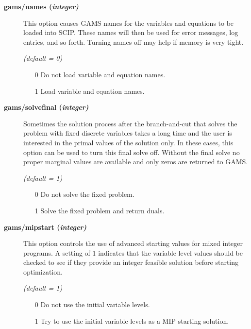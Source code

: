 \begin{description}
\item[\label{scipnames}\hypertarget{scipnames}
{\textbf{gams/names (\slshape{integer})}}]\hspace{1.0in}

This option causes GAMS names for the variables and equations to be loaded into SCIP.
These names will then be used for error messages, log entries, and so forth.
Turning names off may help if memory is very tight.

\textsl{(default = 0)}
\begin{itemize}
\item[0] Do not load variable and equation names.
\item[1] Load variable and equation names.
\end{itemize}


\item[\label{scipsolvefinal}\hypertarget{scipsolvefinal}
{\textbf{gams/solvefinal (\slshape{integer})}}]\hspace{1.0in}

Sometimes the solution process after the branch-and-cut that solves the problem with fixed discrete variables takes a long time and the user is interested in the primal values of the solution only.
In these cases, this option can be used to turn this final solve off.
Without the final solve no proper marginal values are available and only zeros are returned to GAMS.

\textsl{(default = 1)}
\begin{itemize}
\item[0] Do not solve the fixed problem.
\item[1] Solve the fixed problem and return duals.
\end{itemize}


\item[\label{scipmipstart}\hypertarget{scipmipstart}
{\textbf{gams/mipstart (\slshape{integer})}}]\hspace{1.0in}

This option controls the use of advanced starting values for mixed integer programs.
A setting of 1 indicates that the variable level values should be checked to see if they provide an integer feasible solution before starting optimization.

\textsl{(default = 1)}
\begin{itemize}
\item[0] Do not use the initial variable levels.
\item[1] Try to use the initial variable levels as a MIP starting solution.
\end{itemize}



\end{description}
